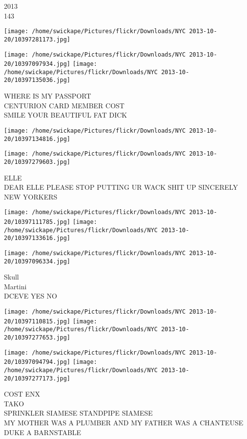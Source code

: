 \documentclass[10pt,letterpaper]{article}
\begin{document}
2013\\
143\\
\pagebreak

\texttt{[image: /home/swickape/Pictures/flickr/Downloads/NYC 2013-10-20/10397281173.jpg]}

\vspace{0.25in}
\texttt{[image: /home/swickape/Pictures/flickr/Downloads/NYC 2013-10-20/10397097934.jpg]}
\texttt{[image: /home/swickape/Pictures/flickr/Downloads/NYC 2013-10-20/10397135036.jpg]}

WHERE IS MY PASSPORT\\
CENTURION CARD MEMBER COST\\
SMILE YOUR BEAUTIFUL FAT DICK\\
\pagebreak

\texttt{[image: /home/swickape/Pictures/flickr/Downloads/NYC 2013-10-20/10397134816.jpg]}

\vspace{0.25in}
\texttt{[image: /home/swickape/Pictures/flickr/Downloads/NYC 2013-10-20/10397279603.jpg]}

ELLE\\
DEAR ELLE PLEASE STOP PUTTING UR WACK SHIT UP SINCERELY NEW YORKERS\\
\pagebreak

\texttt{[image: /home/swickape/Pictures/flickr/Downloads/NYC 2013-10-20/10397111785.jpg]}
\texttt{[image: /home/swickape/Pictures/flickr/Downloads/NYC 2013-10-20/10397133616.jpg]}

\vspace{0.25in}
\texttt{[image: /home/swickape/Pictures/flickr/Downloads/NYC 2013-10-20/10397096334.jpg]}

Skull\\
Martini\\
DCEVE YES NO\\
\pagebreak

\texttt{[image: /home/swickape/Pictures/flickr/Downloads/NYC 2013-10-20/10397110815.jpg]}
\texttt{[image: /home/swickape/Pictures/flickr/Downloads/NYC 2013-10-20/10397277653.jpg]}

\texttt{[image: /home/swickape/Pictures/flickr/Downloads/NYC 2013-10-20/10397094794.jpg]}
\texttt{[image: /home/swickape/Pictures/flickr/Downloads/NYC 2013-10-20/10397277173.jpg]}

COST ENX\\
TAKO\\
SPRINKLER SIAMESE STANDPIPE SIAMESE\\
MY MOTHER WAS A PLUMBER AND MY FATHER WAS A CHANTEUSE DUKE A BARNSTABLE\\
\pagebreak
\end{document}
